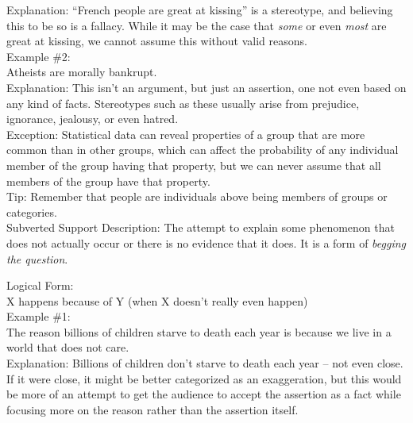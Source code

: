\documentclass[a4paper,12pt,single,pdftex]{scrartcl}
\begin{document}
      
        Explanation: “French people are great at kissing” is a stereotype, and believing this to be so is a fallacy.  While it may be the case that {\it some} or even {\it most} are great at kissing, we cannot assume this without valid reasons.
      \\

      
        Example \#2:
      \\

      
        Atheists are morally bankrupt.
      \\

      
        Explanation: This isn’t an argument, but just an assertion, one not even based on any kind of facts.  Stereotypes such as these usually arise from prejudice, ignorance, jealousy, or even hatred.
      \\

      
        Exception: Statistical data can reveal properties of a group that are more common than in other groups, which can affect the probability of any individual member of the group having that property, but we can never assume that all members of the group have that property.
      \\

      
        Tip: Remember that people are individuals above being members of groups or categories.
      \\

    
  

Subverted Support
    Description: The attempt to explain some phenomenon that does not actually occur or there is no evidence that it does.  It is a form of {\it begging the question}.

    
      Logical Form:
    \\

    
      X happens because of Y (when X doesn’t really even happen)
    \\

    
      Example \#1:
    \\

    
      The reason billions of children starve to death each year is because we live in a world that does not care.
    \\

    
      Explanation: Billions of children don’t starve to death each year -- not even close.  If it were close, it might be better categorized as an exaggeration, but this would be more of an attempt to get the audience to accept the assertion as a fact while focusing more on the reason rather than the assertion itself.
    \\
\end{document}
